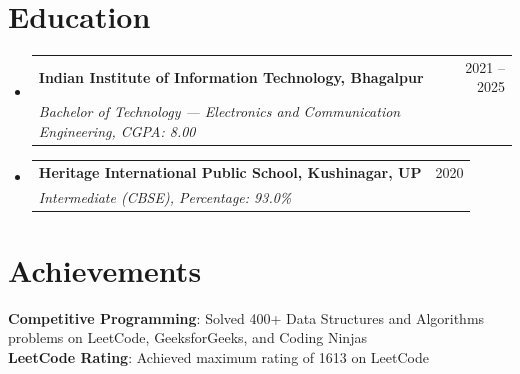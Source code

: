 \documentclass[letterpaper,11pt]{article}
\makeatletter
\newcommand{\resumeSubheading}[4]{
  \vspace{-2pt}\item
    \begin{tabular*}{0.97\textwidth}[t]{l@{\extracolsep{\fill}}r}
      \textbf{#1} & #2 \\
      \textit{\small#3} & \textit{\small #4} \\
    \end{tabular*}\vspace{-7pt}
}
\newcommand{\resumeSubHeadingListStart}{\begin{itemize}[leftmargin=0.15in, label={}]}
\newcommand{\resumeSubHeadingListEnd}{\end{itemize}}
\makeatother
\begin{document}
\section{Education}
  \resumeSubHeadingListStart
    \resumeSubheading
      {Indian Institute of Information Technology, Bhagalpur}{2021 -- 2025}
      {Bachelor of Technology --- Electronics and Communication Engineering, CGPA: 8.00}{}
    \resumeSubheading
      {Heritage International Public School, Kushinagar, UP}{2020}
      {Intermediate (CBSE), Percentage: 93.0\%}{}
  \resumeSubHeadingListEnd

\section{Achievements}
 \begin{itemize}[leftmargin=0.15in, label={}]
    \small{\item{
     \textbf{Competitive Programming}{: Solved 400+ Data Structures and Algorithms problems on LeetCode, GeeksforGeeks, and Coding Ninjas} \\
     \textbf{LeetCode Rating}{: Achieved maximum rating of 1613 on LeetCode}
    }}
 \end{itemize}
\end{document}
